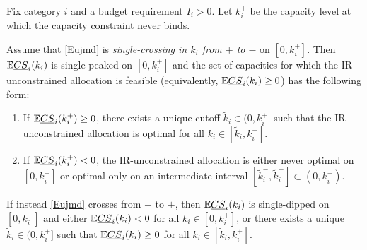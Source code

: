 \documentclass[master.tex]{subfiles}
\begin{document}
\begin{proposition}\label{prop:implementation}
Fix category \(i\) and a budget requirement \(I_i>0\). Let \(k_i^+\) be the capacity level at which the capacity constraint never binds.

Assume that \eqref{Eujmd} is \emph{single-crossing in \(k_i\) from \(+\) to \(-\)} on \([0,k_i^+]\). Then \(\mathbb{E}\underline{CS}_i(k_i)\) is single-peaked on \([0,k_i^+]\) and the set of capacities for which the IR-unconstrained allocation is feasible (equivalently, \(\mathbb{E}\underline{CS}_i(k_i)\ge 0\)) has the following form:
\begin{enumerate}[label=(\roman*), leftmargin=1cm]
\item If \(\mathbb{E}\underline{CS}_i(k_i^+)\ge 0\), there exists a unique cutoff \(\tilde k_i\in(0,k_i^+]\) such that the IR-unconstrained allocation is optimal for all \(k_i\in[\tilde k_i,k_i^+]\).
\item If \(\mathbb{E}\underline{CS}_i(k_i^+)<0\), the IR-unconstrained allocation is either never optimal on \([0,k_i^+]\) or optimal only on an intermediate interval \([\tilde k_i^-,\tilde k_i^+]\subset(0,k_i^+)\).
\end{enumerate}

If instead \eqref{Eujmd} crosses from \(-\) to \(+\), then \(\mathbb{E}\underline{CS}_i(k_i)\) is single-dipped on \([0,k_i^+]\) and either \(\mathbb{E}\underline{CS}_i(k_i)<0\) for all \(k_i\in[0,k_i^+]\), or there exists a unique \(\tilde k_i\in(0,k_i^+]\) such that \(\mathbb{E}\underline{CS}_i(k_i)\ge 0\) for all \(k_i\in[\tilde k_i,k_i^+]\).
\end{proposition}
\end{document}

